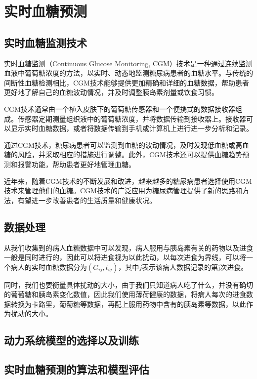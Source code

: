 \chapter{实时血糖预测}\label{chap:predict}
\section{实时血糖监测技术}
实时血糖监测（Continuous Glucose Monitoring, CGM）技术是一种通过连续监测血液中葡萄糖浓度的方法，以实时、动态地监测糖尿病患者的血糖水平。与传统的间断性血糖检测相比，CGM技术能够提供更加精确和详细的血糖数据，帮助患者更好地了解自己的血糖波动情况，并及时调整胰岛素剂量或饮食习惯。

CGM技术通常由一个植入皮肤下的葡萄糖传感器和一个便携式的数据接收器组成。传感器定期测量组织液中的葡萄糖浓度，并将数据传输到接收器上。接收器可以显示实时血糖数据，或者将数据传输到手机或计算机上进行进一步分析和记录。

通过CGM技术，糖尿病患者可以监测到血糖的波动情况，及时发现低血糖或高血糖的风险，并采取相应的措施进行调整。此外，CGM技术还可以提供血糖趋势预测和报警功能，帮助患者更好地管理血糖\cite{vigersky2017role}。

近年来，随着CGM技术的不断发展和改进，越来越多的糖尿病患者选择使用CGM技术来管理他们的血糖。CGM技术的广泛应用为糖尿病管理提供了新的思路和方法，有望进一步改善患者的生活质量和健康状况。
\section{数据处理}
从我们收集到的病人血糖数据中可以发现，病人服用与胰岛素有关的药物以及进食一般是同时进行的，因此可以将进食视为以此扰动，以每次进食为界线，可以将一个病人的实时血糖数据分为$(G_{ij}, t_{ij})$，其中$j$表示该病人数据记录的第j次进食。

同时，我们也要衡量具体扰动的大小，由于我们只知道病人吃了什么，并没有确切的葡萄糖和胰岛素变化数值，因此我们使用薄荷健康的数据，将病人每次的进食数据转换为卡路里，葡萄糖等数据，再配上服用药物中含有的胰岛素等数据，以此作为扰动的大小。
\section{动力系统模型的选择以及训练}
\section{实时血糖预测的算法和模型评估} 